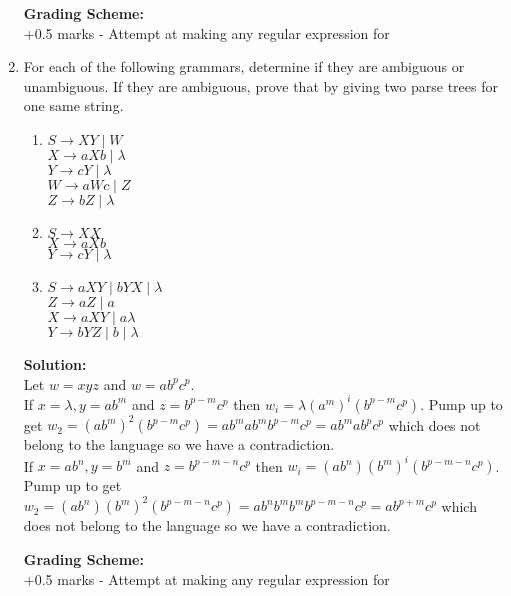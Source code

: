 \documentclass[11pt, article, oneside]{memoir}
\begin{document}
\begin{enumerate}
        \textbf{Grading Scheme:}
        \\+0.5 marks - Attempt at making any regular expression for
        
    \item
        For each of the following grammars, determine if they are ambiguous or unambiguous. If they are ambiguous, prove that by giving two parse trees for one same string.
        \begin{enumerate}
            \item
                \(S \rightarrow XY \mid W \)
                \\\(X \rightarrow aXb \mid \lambda\)
                \\\(Y \rightarrow cY \mid \lambda\)
                \\\(W \rightarrow aWc \mid Z\)
                \\\(Z \rightarrow bZ \mid \lambda\)
            \item
                \(S \rightarrow XX \)
                \\\(X \rightarrow aXb\)
                \\\(Y \rightarrow cY \mid \lambda\)
            \item
                \(S \rightarrow aXY \mid bYX \mid \lambda \)
                \\\(Z \rightarrow aZ \mid a\)
                \\\(X \rightarrow aXY \mid a \lambda\)
                \\\(Y \rightarrow bYZ \mid b \mid \lambda\) 
        \end{enumerate}

        \textbf{Solution:}
        \\Let \(w = xyz\) and \(w = ab^pc^p\).
        \\If \(x = \lambda, y = ab^m\) and \(z = b^{p - m}c^p\) then \(w_i = \lambda(a^m)^i(b^{p - m}c^p)\). Pump up to get \(w_2 = (ab^m)^2(b^{p - m}c^p) = ab^mab^mb^{p - m}c^p = ab^mab^pc^p\) which does not belong to the language so we have a contradiction.
        \\If \(x = ab^n, y = b^m\) and \(z = b^{p - m - n}c^p\) then \(w_i = (ab^n)(b^m)^i(b^{p - m - n}c^p)\). Pump up to get \(w_2 = (ab^n)(b^m)^2(b^{p - m - n}c^p) = ab^nb^mb^mb^{p - m - n}c^p = ab^{p + m}c^p\) which does not belong to the language so we have a contradiction.

        \textbf{Grading Scheme:}
        \\+0.5 marks - Attempt at making any regular expression for
        

\end{enumerate}
\end{document}
